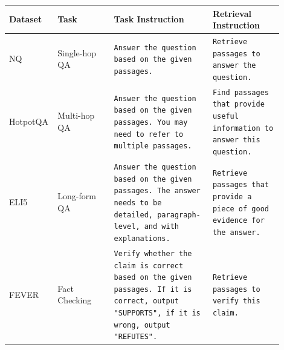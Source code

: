 \documentclass[11pt]{article}
\begin{document}
\begin{table}[p]
\center
\small
\begin{tabular}{p{0.1\linewidth}  p{0.2\linewidth}  p{0.35\linewidth}  p{0.25\linewidth}}
\toprule
\textbf{Dataset} & \textbf{Task} & \textbf{Task Instruction} & \textbf{Retrieval Instruction} \\

\hline

\multirow{3}{*}{NQ} & \multirow{3}{*}{Single-hop QA} & \multirow{3}{\linewidth}{\texttt{Answer the question based on the given passages.}} & \multirow{3}{\linewidth}{\texttt{Retrieve passages to answer the question.}} \\
& & & \\
& & & \\

\hline

\multirow{5}{*}{HotpotQA} & \multirow{5}{*}{Multi-hop QA} & \multirow{5}{\linewidth}{\texttt{Answer the question based on the given passages. You may need to refer to multiple passages.}} & \multirow{5}{\linewidth}{\texttt{Find passages that provide useful information to answer this question.}} \\
& & & \\
& & & \\
& & & \\
& & & \\

\hline


\multirow{5}{*}{ELI5} & \multirow{5}{*}{Long-form QA} & \multirow{5}{\linewidth}{\texttt{Answer the question based on the given passages. The answer needs to be detailed, paragraph-level, and with explanations.}} & \multirow{5}{\linewidth}{\texttt{Retrieve passages that provide a piece of good evidence for the answer.}} \\
& & & \\
& & & \\
& & & \\
& & & \\


\hline


\multirow{5}{*}{FEVER} & \multirow{5}{*}{Fact Checking} & \multirow{5}{\linewidth}{\texttt{Verify whether the claim is correct based on the given passages. If it is correct, output "SUPPORTS", if it is wrong, output "REFUTES".}} & \multirow{5}{\linewidth}{\texttt{Retrieve passages to verify this claim.}} \\
& & & \\
& & & \\
& & & \\
& & & \\




\end{tabular}
\end{table}
\end{document}
